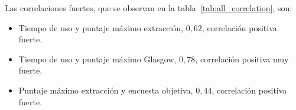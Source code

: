 Las correlaciones fuertes, que se observan en la
tabla~\ref{tab:all_correlation}, son:

\begin{itemize}
    \item Tiempo de uso y puntaje máximo extracción, $0,62$, correlación
        positiva fuerte.
    \item Tiempo de uso y puntaje máximo Glasgow, $0,78$, correlación positiva
        muy fuerte.
    \item Puntaje máximo extracción y encuesta objetiva, $0,44$, correlación
        positiva fuerte.
\end{itemize}



